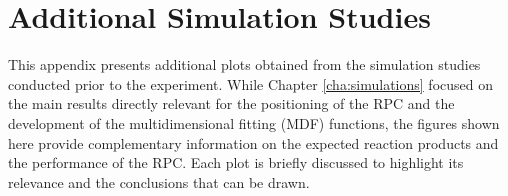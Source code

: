 
%

\chapter{Additional Simulation Studies}
\label{app:rpc_plots}






This appendix presents additional plots obtained from the simulation studies conducted prior to the experiment. While Chapter \ref{cha:simulations} focused on the main results directly relevant for the positioning of the \gls{RPC} and the development of the multidimensional fitting (\gls{MDF}) functions, the figures shown here provide complementary information on the expected reaction products and the performance of the \gls{RPC}. Each plot is briefly discussed to highlight its relevance and the conclusions that can be drawn.

